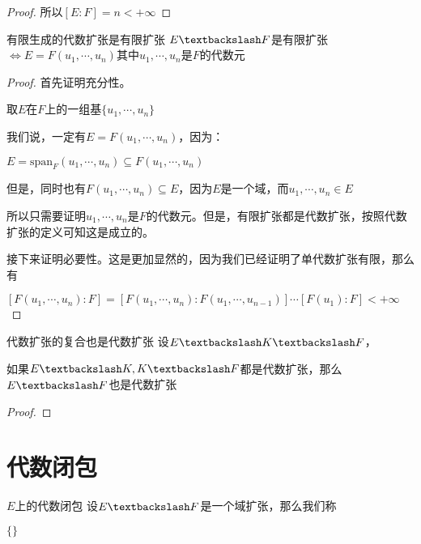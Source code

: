 \documentclass[12pt, a4paper, oneside, UTF8]{ctexbook}
\begin{document}
\begin{para}{0}
\begin{proof}
						所以$[E:F]=n < +\infty$
					\end{proof}
					\begin{them}{有限生成的代数扩张是有限扩张}{}
						$E \textbackslash F$是有限扩张$\Leftrightarrow E=F(u_1,\cdots,u_n)$其中$u_1,\cdots,u_n$是$F$的代数元
					\end{them}
					\begin{proof}
						首先证明充分性。
						
						取$E$在$F$上的一组基$\{u_1,\cdots,u_n\}$

						我们说，一定有$E=F(u_1,\cdots,u_n)$，因为：

						$E=\text{span}_F (u_1,\cdots,u_n) \subseteq F(u_1,\cdots,u_n)$

						但是，同时也有$F(u_1,\cdots,u_n) \subseteq E$，因为$E$是一个域，而$u_1,\cdots,u_n \in E$

						所以只需要证明$u_1,\cdots,u_n$是$F$的代数元。但是，有限扩张都是代数扩张，按照代数扩张的定义可知这是成立的。

						接下来证明必要性。这是更加显然的，因为我们已经证明了单代数扩张有限，那么有

						$[F(u_1,\cdots,u_n):F]=[F(u_1,\cdots,u_{n}):F(u_1,\cdots,u_{n-1})]\cdots [F(u_1):F] < +\infty$
					\end{proof}
					\begin{them}{代数扩张的复合也是代数扩张}{}
						设$E\textbackslash K\textbackslash F$，

						如果$E\textbackslash K,K\textbackslash F$都是代数扩张，那么$E\textbackslash F$也是代数扩张
					\end{them}
					\begin{proof}
						
					\end{proof}
			\end{para}
			
	\section{代数闭包}
		\begin{defn}{$E$上的代数闭包}{}
				设$E \textbackslash F$是一个域扩张，那么我们称
				
				$\{\}$
		\end{defn}
\ifx\allfiles\undefined
\end{document}

